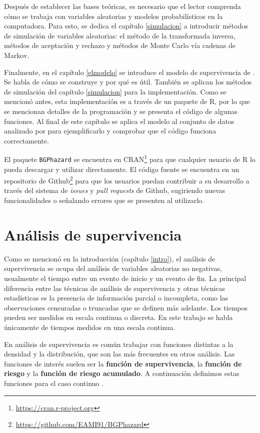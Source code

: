 \documentclass[11pt,a4paper]{article}
\begin{document}
Después de establecer las bases teóricas, es necesario que el lector comprenda cómo se trabaja con variables aleatorias y modelos probabilísticos en la computadora. Para esto, se dedica el capítulo \ref{simulacion} a introducir métodos de simulación de variables aleatorias: el método de la transformada inversa, métodos de aceptación y rechazo y métodos de Monte Carlo vía cadenas de Markov.

Finalmente, en el capítulo \ref{elmodelo} se introduce el modelo de supervivencia de \citet{nieto}. Se habla de cómo se construye y por qué es útil. También se aplican los métodos de simulación del capítulo \ref{simulacion} para la implementación. Como se mencionó antes, esta implementación es a través de un paquete de R, por lo que se mencionan detalles de la programación y se presenta el código de algunas funciones. Al final de este capítulo se aplica el modelo al conjunto de datos analizado por \citet{nieto} para ejemplificarlo y comprobar que el código funciona correctamente.

El paquete \texttt{BGPhazard} \citep{bgphazard} se encuentra en CRAN\footnote{\url{https://cran.r-project.org}} para que cualquier usuario de R lo pueda descargar y utilizar directamente.  El código fuente se encuentra en un repositorio de Github\footnote{\url{https://github.com/EAMI91/BGPhazard}} para que los usuarios puedan contribuir a su desarrollo a través del sistema de \textit{issues} y \textit{pull requests} de Github, sugiriendo nuevas funcionalidades o señalando errores que se presenten al utilizarlo.

\newpage

\section{Análisis de supervivencia} \label{analisis_sup}

Como se mencionó en la introducción (capítulo \ref{intro}), el análisis de supervivencia se ocupa del análisis de variables aleatorias no negativas, usualmente el tiempo entre un evento de inicio y un evento de fin.  La principal diferencia entre las técnicas de análisis de supervivencia y otras técnicas estadísticas es la presencia de información parcial o incompleta, como las observaciones censuradas o truncadas que se definen más adelante. Los tiempos pueden ser medidos en escala continua o discreta.  En este trabajo se habla únicamente de tiempos medidos en una escala continua.

En análisis de supervivencia es común trabajar con funciones distintas a la densidad y la distribución, que son las más frecuentes en otros análisis. Las funciones de interés suelen ser la \textbf{función de supervivencia}, la \textbf{función de riesgo} y la \textbf{función de riesgo acumulado}. A continuación definimos estas funciones para el caso continuo \citep{klein}.
\end{document}
